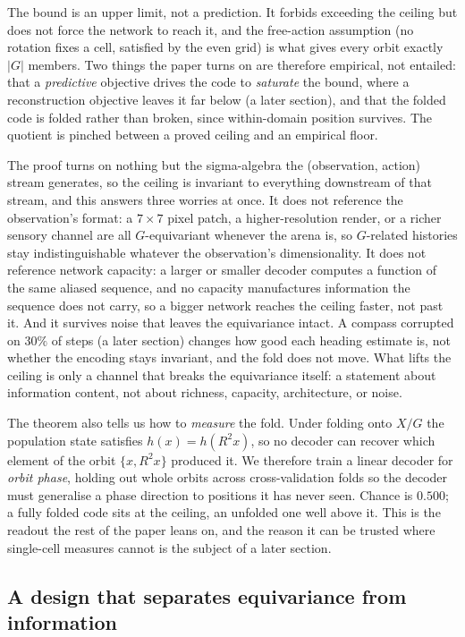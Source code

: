 The bound is an upper limit, not a prediction. It forbids exceeding the ceiling but does not force
the network to reach it, and the free-action assumption (no rotation fixes a cell, satisfied by the
even grid) is what gives every orbit exactly $|G|$ members. Two things the paper turns on are
therefore empirical, not entailed: that a \emph{predictive} objective drives the code to
\emph{saturate} the bound, where a reconstruction objective leaves it far below (a later section),
and that the folded code is folded rather than broken, since within-domain position survives. The
quotient is pinched between a proved ceiling and an empirical floor.

The proof turns on nothing but the sigma-algebra the (observation, action) stream generates, so the
ceiling is invariant to everything downstream of that stream, and this answers three worries at once.
It does not reference the observation's format: a $7\times7$ pixel patch, a higher-resolution render,
or a richer sensory channel are all $G$-equivariant whenever the arena is, so $G$-related histories
stay indistinguishable whatever the observation's dimensionality. It does not reference network
capacity: a larger or smaller decoder computes a function of the same aliased sequence, and no
capacity manufactures information the sequence does not carry, so a bigger network reaches the ceiling
faster, not past it. And it survives noise that leaves the equivariance intact. A compass corrupted
on $30\%$ of steps (a later section) changes how good each heading estimate is, not whether the
encoding stays invariant, and the fold does not move. What lifts the ceiling is only a channel that
breaks the equivariance itself: a statement about information content, not about richness, capacity,
architecture, or noise.

The theorem also tells us how to \emph{measure} the fold. Under folding onto $X/G$ the population
state satisfies $h(x) = h(R^2x)$, so no decoder can recover which element of the orbit $\{x, R^2x\}$
produced it. We therefore train a linear decoder for \emph{orbit phase}, holding out whole orbits
across cross-validation folds so the decoder must generalise a phase direction to positions it has
never seen. Chance is $0.500$; a fully folded code sits at the ceiling, an unfolded one well above it.
This is the readout the rest of the paper leans on, and the reason it can be trusted where single-cell
measures cannot is the subject of a later section.

\subsection*{A design that separates equivariance from information}

